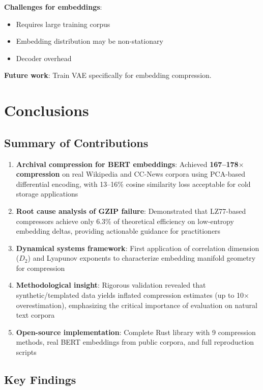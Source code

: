 \documentclass[11pt,a4paper]{article}
\begin{document}
\textbf{Challenges for embeddings}:
\begin{itemize}
\item Requires large training corpus
\item Embedding distribution may be non-stationary
\item Decoder overhead
\end{itemize}

\textbf{Future work}: Train VAE specifically for embedding compression.

\section{Conclusions}

\subsection{Summary of Contributions}

\begin{enumerate}
\item \textbf{Archival compression for BERT embeddings}: Achieved \textbf{167--178$\times$ compression} on real Wikipedia and CC-News corpora using PCA-based differential encoding, with 13--16\% cosine similarity loss acceptable for cold storage applications

\item \textbf{Root cause analysis of GZIP failure}: Demonstrated that LZ77-based compressors achieve only 6.3\% of theoretical efficiency on low-entropy embedding deltas, providing actionable guidance for practitioners

\item \textbf{Dynamical systems framework}: First application of correlation dimension ($D_2$) and Lyapunov exponents to characterize embedding manifold geometry for compression

\item \textbf{Methodological insight}: Rigorous validation revealed that synthetic/templated data yields inflated compression estimates (up to 10$\times$ overestimation), emphasizing the critical importance of evaluation on natural text corpora

\item \textbf{Open-source implementation}: Complete Rust library with 9 compression methods, real BERT embeddings from public corpora, and full reproduction scripts
\end{enumerate}

\subsection{Key Findings}
\end{document}
